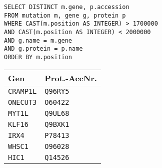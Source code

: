 \documentclass{scrartcl}
\begin{document}
\noindent\begin{minipage}{.65\hsize}
\begin{verbatim}
SELECT DISTINCT m.gene, p.accession
FROM mutation m, gene g, protein p
WHERE CAST(m.position AS INTEGER) > 1700000
AND CAST(m.position AS INTEGER) < 2000000
AND g.name = m.gene
AND g.protein = p.name
ORDER BY m.position
\end{verbatim}
\end{minipage}
\begin{minipage}{.35\hsize}
\hfill\begin{tabular}{ll}
\toprule
Gen & Prot.-AccNr. \\
\midrule
\texttt{CRAMP1L}&\texttt{Q96RY5}\\
\texttt{ONECUT3}&\texttt{O60422}\\
\texttt{MYT1L}&\texttt{Q9UL68}\\
\texttt{KLF16}&\texttt{Q9BXK1}\\
\texttt{IRX4}&\texttt{P78413}\\
\texttt{WHSC1}&\texttt{O96028}\\
\texttt{HIC1}&\texttt{Q14526}\\
\bottomrule
\end{tabular}
\end{minipage}
\end{document}
